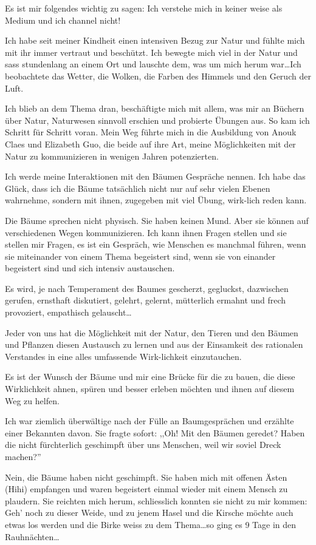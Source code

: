 \documentclass[11pt,titlepage,a5paper]{book}
\begin{document}
Es ist mir folgendes wichtig zu sagen: Ich verstehe mich in keiner weise als Medium und ich channel nicht!

Ich habe seit meiner Kindheit einen intensiven Bezug zur Natur und fühlte mich mit ihr immer vertraut und beschützt. Ich bewegte mich viel in der Natur und sass stundenlang an einem Ort und lauschte dem, was um mich herum war\dots Ich beobachtete das Wetter, die Wolken, die Farben des Himmels und den Geruch der Luft.

Ich blieb an dem Thema dran, beschäftigte mich mit allem, was mir an Büchern über Natur, Naturwesen sinnvoll erschien und probierte Übungen aus. So kam ich Schritt für Schritt voran. Mein Weg führte mich in die Ausbildung von Anouk Claes und Elizabeth Guo, die beide auf ihre Art, meine Möglichkeiten mit der Natur zu kommunizieren in wenigen Jahren potenzierten.

Ich werde meine Interaktionen mit den Bäumen Gespräche nennen. Ich habe das Glück, dass ich die Bäume tatsächlich nicht nur auf sehr vielen Ebenen wahrnehme, sondern mit ihnen, zugegeben mit viel Übung, wirk-lich reden kann. 

Die Bäume sprechen nicht physisch. Sie haben keinen Mund. Aber sie können auf verschiedenen Wegen kommunizieren. Ich kann ihnen Fragen stellen und sie stellen mir Fragen, es ist ein Gespräch, wie Menschen es manchmal führen, wenn sie miteinander von einem Thema begeistert sind, wenn sie von einander begeistert sind und sich intensiv austauschen.

Es wird, je nach Temperament des Baumes gescherzt, gegluckst, dazwischen gerufen, ernsthaft diskutiert, gelehrt, gelernt, mütterlich ermahnt und frech provoziert, empathisch gelauscht\dots

Jeder von uns hat die Möglichkeit mit der Natur, den Tieren und den Bäumen und Pflanzen diesen Austausch zu lernen und aus der Einsamkeit des rationalen Verstandes in eine alles umfassende Wirk-lichkeit einzutauchen.

Es ist der Wunsch der Bäume und mir eine Brücke für die zu bauen, die diese Wirklichkeit ahnen, spüren und besser erleben möchten und ihnen auf diesem Weg zu helfen.

Ich war ziemlich überwältige nach der Fülle an Baumgesprächen und erzählte einer Bekannten davon. Sie fragte sofort: ,,Oh! Mit den Bäumen geredet? Haben die nicht fürchterlich geschimpft über uns Menschen, weil wir soviel Dreck machen?'' 

Nein, die Bäume haben nicht geschimpft. Sie haben mich mit offenen Ästen (Hihi) empfangen und waren begeistert einmal wieder mit einem Mensch zu plaudern. Sie reichten mich herum, schliesslich konnten sie nicht zu mir kommen: Geh' noch zu dieser Weide, und zu jenem Hasel und die Kirsche möchte auch etwas los werden und die Birke weiss zu dem Thema\dots so ging es 9 Tage in den Rauhnächten\dots
\end{document}
